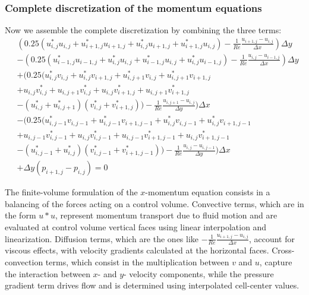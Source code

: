 \documentclass{article}
\begin{document}
\subsubsection*{Complete discretization of the momentum equations}
Now we assemble the complete discretization by combining the three terms:
\begin{equation}
  \begin{aligned}
    & (0.25 (u^*_{i,j} u_{i,j} + u^*_{i+1,j} u_{i+1,j} + u^*_{i,j} u_{i+1,j} + u^*_{i+1,j} u_{i,j}) - \frac{1}{Re} \frac{u_{i+1,j} - u_{i,j}}{\Delta x}) \Delta y  \\
    & - (0.25 (u^*_{i-1,j} u_{i-1,j} + u^*_{i,j} u_{i,j} + u^*_{i-1,j} u_{i,j} + u^*_{i,j} u_{i-1,j}) - \frac{1}{Re} \frac{u_{i,j} - u_{i-1,j}}{\Delta x}) \Delta y \\
    & + (0.25 (u^*_{i,j}v_{i,j} + u^*_{i,j}v_{i+1,j} + u^*_{i,j+1}v_{i,j} + u^*_{i,j+1}v_{i+1,j} \\
    & + u_{i,j}v^*_{i,j} + u_{i,j+1}v^*_{i,j} + u_{i,j}v^*_{i+1,j} + u_{i,j+1}v^*_{i+1,j} \\
    & - (u^*_{i,j} + u^*_{i,j+1}) (v^*_{i,j} + v^*_{i+1,j})) - \frac{1}{Re} \frac{u_{i,j+1} - u_{i,j}}{\Delta y}) \Delta x \\
    & - (0.25 (u^*_{i,j-1}v_{i,j-1} + u^*_{i,j-1}v_{i+1,j-1} + u^*_{i,j}v_{i,j-1} + u^*_{i,j}v_{i+1,j-1} \\
    & + u_{i,j-1}v^*_{i,j-1} + u_{i,j}v^*_{i,j-1} + u_{i,j-1}v^*_{i+1,j-1} + u_{i,j}v^*_{i+1,j-1} \\
    & - (u^*_{i,j-1} + u^*_{i,j}) (v^*_{i,j-1} + v^*_{i+1,j-1})) - \frac{1}{Re} \frac{u_{i,j} - u_{i,j-1}}{\Delta y}) \Delta x \\
    & + \Delta y (p_{i+1,j} - p_{i,j}) = 0
  \end{aligned}
\end{equation}

The finite-volume formulation of the $x$-momentum equation consists in a balancing of the forces acting on a control volume.
Convective terms, which are in the form $u*u$, represent momentum transport due to fluid motion and are evaluated at control volume vertical faces using linear interpolation and linearization.
Diffusion terms, which are the ones like $-\frac{1}{Re} \frac{u_{i+1,j} - u_{i,j}}{\Delta x}$, account for viscous effects, with velocity gradients calculated at the horizontal faces.
Cross-convection terms, which consist in the multiplication between $v$ and $u$, capture the interaction between $x$- and $y$- velocity components, while the pressure gradient term drives flow and is determined using interpolated cell-center values.
\end{document}
